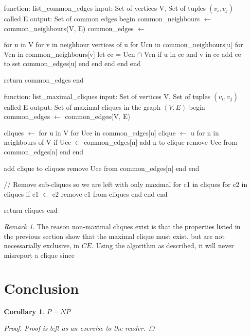 \documentclass{article}
\theoremstyle{plain}
\newtheorem{cor}[thm]{Corollary}
\theoremstyle{definition}
\theoremstyle{remark}
\newtheorem*{rem}{Remark}
\newcommand{\ce}[1]{ {{CE}_{#1}} }
\begin{document}
\begin{algorithm}[caption={Create Common Edge Set}, label={algo_ce_construct}]
function: list_common_edges
    input: Set of vertices V, Set of tuples $(v_i, v_j)$ called E
    output: Set of common edges
    begin
        common_neighbours $\gets$ common_neighbours(V, E)
        common_edges $\gets$ {}

        for u in V
            for v in neighbour vertices of u
                for Ucn in common_neighbours[u]
                    for Vcn in common_neighbours[v]
                        let ce = Ucn $\cap$ Vcn
                        if u in ce and v in ce
                            add ce to set common_edges[u]
                        end
                    end
                end
            end
        end

        return common_edges
    end
\end{algorithm}

\begin{algorithm}[caption={List Maximal Cliques}, label={algo_list_cliques}]
function: list_maximal_cliques
    input: Set of vertices V, Set of tuples $(v_i, v_j)$ called E
    output: Set of maximal cliques in the graph $(V, E)$
    begin
        common_edges $\gets$ common_edges(V, E)

        cliques $\gets$ {}
        for u in V
            for Uce in common_edges[u]
                clique $\gets$ {u}
                for n in neighbours of V
                    if Uce $\in$ common_edges[n]
                        add n to clique
                        remove Uce from common_edges[n]
                    end
                end

                add clique to cliques
                remove Uce from common_edges[n]
            end
        end

        // Remove sub-cliques so we are left with only maximal
        for c1 in cliques
            for c2 in cliques
                if c1 $\subset$ c2
                    remove c1 from cliques
                end
            end
        end

        return cliques
    end
\end{algorithm}

\begin{rem}
    The reason non-maximal cliques exist is that the properties listed in the previous
    section show that the maximal clique must exist, but are not necessarially
    exclusive, in \(\ce{}\). Using the algorithm as described, it will never misreport a
    clique since
\end{rem}

\section{Conclusion}

\begin{cor}
    \(P = NP\)
    \begin{proof}
        Proof is left as an exercise to the reader.
    \end{proof}
\end{cor}
\end{document}
